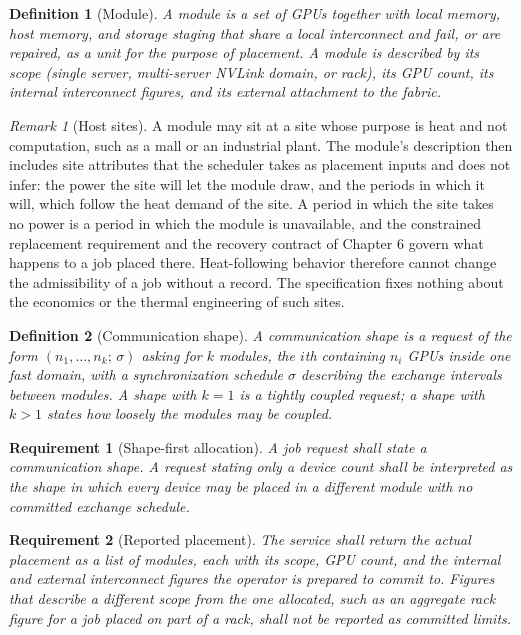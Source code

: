 \documentclass[11pt,openany]{book}
\newtheorem{definition}{Definition}[chapter]
\newtheorem{requirement}{Requirement}[chapter]
\theoremstyle{remark}
\newtheorem{remark}{Remark}[chapter]
\begin{document}
\begin{definition}[Module]
A module is a set of GPUs together with local memory, host memory, and storage staging that share a local interconnect and fail, or are repaired, as a unit for the purpose of placement. A module is described by its scope (single server, multi-server NVLink domain, or rack), its GPU count, its internal interconnect figures, and its external attachment to the fabric.
\end{definition}

\begin{remark}[Host sites]\label{rem:host}
A module may sit at a site whose purpose is heat and not computation, such as a mall or an industrial plant. The module's description then includes site attributes that the scheduler takes as placement inputs and does not infer: the power the site will let the module draw, and the periods in which it will, which follow the heat demand of the site. A period in which the site takes no power is a period in which the module is unavailable, and the constrained replacement requirement and the recovery contract of Chapter 6 govern what happens to a job placed there. Heat-following behavior therefore cannot change the admissibility of a job without a record. The specification fixes nothing about the economics or the thermal engineering of such sites.
\end{remark}

\begin{definition}[Communication shape]\label{def:shape}
A communication shape is a request of the form $(n_1,\dots,n_k;\, \sigma)$ asking for $k$ modules, the $i$th containing $n_i$ GPUs inside one fast domain, with a synchronization schedule $\sigma$ describing the exchange intervals between modules. A shape with $k=1$ is a tightly coupled request; a shape with $k>1$ states how loosely the modules may be coupled.
\end{definition}

\begin{requirement}[Shape-first allocation]
A job request shall state a communication shape. A request stating only a device count shall be interpreted as the shape in which every device may be placed in a different module with no committed exchange schedule.
\end{requirement}

\begin{requirement}[Reported placement]
The service shall return the actual placement as a list of modules, each with its scope, GPU count, and the internal and external interconnect figures the operator is prepared to commit to. Figures that describe a different scope from the one allocated, such as an aggregate rack figure for a job placed on part of a rack, shall not be reported as committed limits.
\end{requirement}
\end{document}
